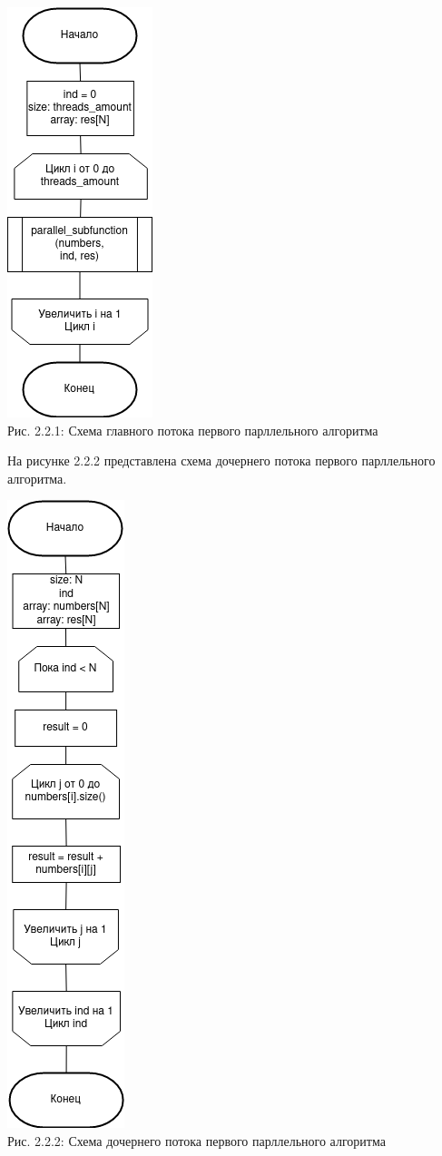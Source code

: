 \documentclass[12pt,a4paper]{article}
\numberwithin{equation}{section}
\begin{document}
\begin{center}	
	\includegraphics[width=.3\linewidth]{src/schemas/parallel1_main.png}\\
	Рис. 2.2.1: Схема главного потока первого парллельного алгоритма
\end{center}
\clearpage
На рисунке 2.2.2 представлена схема дочернего потока первого парллельного алгоритма.\\
\begin{center}	
	\includegraphics[width=.2\linewidth]{src/schemas/parallel1_thread.png}\\
	Рис. 2.2.2: Схема дочернего потока первого парллельного алгоритма
\end{center}
\end{document}

